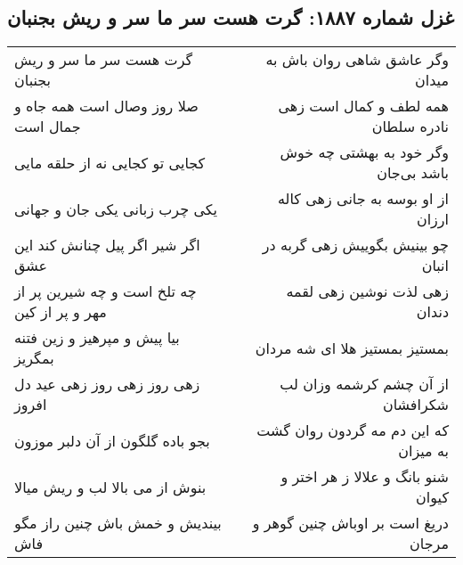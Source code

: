 \begin{center}
\section*{غزل شماره ۱۸۸۷: گرت هست سر ما سر و ریش بجنبان}
\label{sec:1887}
\begin{longtable}{l p{0.5cm} r}
گرت هست سر ما سر و ریش بجنبان
&&
وگر عاشق شاهی روان باش به میدان
\\
صلا روز وصال است همه جاه و جمال است
&&
همه لطف و کمال است زهی نادره سلطان
\\
کجایی تو کجایی نه از حلقه مایی
&&
وگر خود به بهشتی چه خوش باشد بی‌جان
\\
یکی چرب زبانی یکی جان و جهانی
&&
از او بوسه به جانی زهی کاله ارزان
\\
اگر شیر اگر پیل چنانش کند این عشق
&&
چو بینیش بگوییش زهی گربه در انبان
\\
چه تلخ است و چه شیرین پر از مهر و پر از کین
&&
زهی لذت نوشین زهی لقمه دندان
\\
بیا پیش و مپرهیز و زین فتنه بمگریز
&&
بمستیز بمستیز هلا ای شه مردان
\\
زهی روز زهی روز زهی عید دل افروز
&&
از آن چشم کرشمه وزان لب شکرافشان
\\
بجو باده گلگون از آن دلبر موزون
&&
که این دم مه گردون روان گشت به میزان
\\
بنوش از می بالا لب و ریش میالا
&&
شنو بانگ و علالا ز هر اختر و کیوان
\\
بیندیش و خمش باش چنین راز مگو فاش
&&
دریغ است بر اوباش چنین گوهر و مرجان
\\
\end{longtable}
\end{center}
